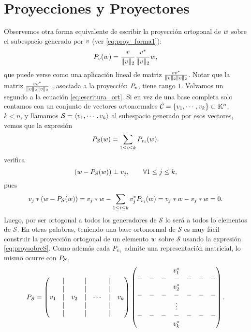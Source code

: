\section{Proyecciones y Proyectores}
\label{sec:proyectores}
Observemos otra forma equivalente de escribir la proyección ortogonal de $\wb$ sobre el subespacio generado por $\vb$ (ver \eqref{eq:proy_forma1}):
\begin{equation}
 \label{eq:proy_forma2}
 \Pb_{\vb}(\wb)=\frac{\vb}{\|\vb\|_2}\frac{\vb^*}{\|\vb\|_2}\wb,
\end{equation}
que puede verse como una aplicación lineal de matriz  $\frac{\vb\vb^*}{\|\vb\|_2\|\vb\|_2}$.
\tcc
Notar que la matriz $\frac{\vb\vb^*}{\|\vb\|_2\|\vb\|_2}$ , asociada a la proyección $\Pb_{\vb}$, tiene rango $1$.
\etcc
Volvamos un segundo a la ecuación \eqref{eq:escritura_ort}. Si en vez de una base completa solo contamos con un conjunto de vectores ortonormales $\mathcal{C}=\{\vb_1,\cdots,\vb_k\}\subset \Kn$, $k<n$, y llamamos $\mathcal{S}=\langle \vb_1,\cdots,\vb_k\rangle$ al subespacio generado por esos vectores, vemos  que la expresión
\begin{equation}
 \label{eq:proysobreS}
\Pb_{\mathcal{S}}(\wb)=\sum_{1\le i\le k}\Pb_{\vb_i}(\wb).
\end{equation}
verifica
$$
(\wb-\Pb_{\mathcal{S}}(\wb))\perp \vb_j, \qquad \forall 1\le j\le k,
$$
pues
$$
\vb_j*(\wb-\Pb_{\mathcal{S}}(\wb))=\vb_j*\wb -\sum_{1\le i\le k}\vb_j^*\Pb_{\vb_i}(\wb)= \vb_j*\wb-\vb_j*\wb=0.
$$
Luego, por ser ortogonal a todos los generadores de $\mathcal{S}$ lo será a todos lo elementos de $\mathcal{S}$. En otras palabras, teniendo una base ortonormal de $\mathcal{S}$ es muy fácil construir la proyección ortogonal de un elemento $\wb$ sobre  $\mathcal{S}$ usando la expresión \eqref{eq:proysobreS}.
Como además cada $\Pb_{\vb_i}$ admite una representación matricial, lo mismo ocurre con  $\Pb_{\mathcal{S}}$,
$$\Pb_{\mathcal{S}}=
\begin{pmatrix}
&|&&|&&|&\\
&|&&|&&|&\\
\vb_1&|&\vb_2&|&\cdots&|&\vb_k\\
&|&&|&&|&\\
&|&&|&&|&\\
\end{pmatrix}
\begin{pmatrix}
&&&\vb_1^*&&&\\
-&-&-&-&-&-&-\\
&&&\vb_2^*&&&\\
-&-&-&-&-&-&-\\
 &&&\vdots&&& \\
-&-&-&-&-&-&-\\
&&&\vb_k^*&&&
\end{pmatrix}.
$$
